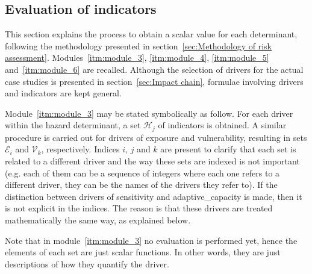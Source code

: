 \subsection{Evaluation of indicators}
\label{sec:Evaluation of indicators}
This section explains the process to obtain a scalar value for each \gls{determinant}, following the methodology presented in section~\ref{sec:Methodology of risk assessment}. Modules~\ref{itm:module_3}, \ref{itm:module_4}, \ref{itm:module_5} and~\ref{itm:module_6} are recalled.
Although the selection of \glspl{driver} for the actual case studies is presented in section~\ref{sec:Impact chain}, formulae involving \glspl{driver} and \glspl{indicator} are kept general.

Module~\ref{itm:module_3} may be stated symbolically as follow. For each \gls{driver} within the \gls{hazard} \gls{determinant}, a set $\mathcal{H}_j$ of \glspl{indicator} is obtained. A similar procedure is carried out for \glspl{driver} of \gls{exposure} and \gls{vulnerability}, resulting in sets $\mathcal{E}_i$ and $\mathcal{V}_k$, respectively. Indices $i$, $j$ and $k$ are present to clarify that each set is related to a different \gls{driver} and the way these sets are indexed is not important (e.g. each of them can be a sequence of integers where each one refers to a different \gls{driver}, they can be the names of the \glspl{driver} they refer to).
If the distinction between \glspl{driver} of \gls{sensitivity} and \gls{adaptive_capacity} is made, then it is not explicit in the indices. The reason is that these \glspl{driver} are treated mathematically the same way, as explained below.

Note that in module~\ref{itm:module_3} no evaluation is performed yet, hence the elements of each set are just scalar functions. In other words, they are just descriptions of how they quantify the \gls{driver}.

